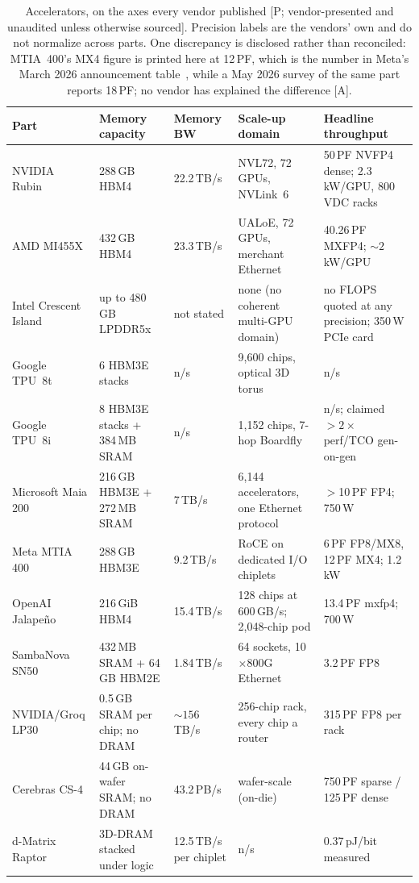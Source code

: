 \begin{table}[htbp]
  \centering
  \scriptsize
  \setlength{\tabcolsep}{3pt}
  \caption{Accelerators, on the axes every vendor published [P; vendor-presented and unaudited unless otherwise sourced]. Precision labels are the vendors' own and do not normalize across parts. One discrepancy is disclosed rather than reconciled: MTIA~400's MX4 figure is printed here at 12\,PF, which is the number in Meta's March 2026 announcement table~\cite{mtia400}, while a May 2026 survey of the same part reports 18\,PF; no vendor has explained the difference [A].}
  \label{tab:hc-accel}
  \begin{tabular}{p{21mm}p{27mm}p{19mm}p{29mm}p{33mm}}
    \toprule
    Part & Memory capacity & Memory BW & Scale-up domain & Headline throughput \\
    \midrule
    NVIDIA Rubin & 288\,GB HBM4 & 22.2\,TB/s & NVL72, 72 GPUs, NVLink~6 & 50\,PF NVFP4 dense; 2.3\,kW/GPU, 800\,VDC racks \\
    \addlinespace
    AMD MI455X & 432\,GB HBM4 & 23.3\,TB/s & UALoE, 72 GPUs, merchant Ethernet & 40.26\,PF MXFP4; ${\sim}2$\,kW/GPU \\
    \addlinespace
    Intel Crescent Island & up to 480\,GB LPDDR5x & not stated & none (no coherent multi-GPU domain) & no FLOPS quoted at any precision; 350\,W PCIe card \\
    \addlinespace
    Google TPU~8t & 6 HBM3E stacks & n/s & 9{,}600 chips, optical 3D torus & n/s~\cite{hc2026-tpu8} \\
    \addlinespace
    Google TPU~8i & 8 HBM3E stacks + 384\,MB SRAM & n/s & 1{,}152 chips, 7-hop Boardfly & n/s; claimed $>2\times$ perf/TCO gen-on-gen~\cite{hc2026-tpu8} \\
    \addlinespace
    Microsoft Maia 200 & 216\,GB HBM3E + 272\,MB SRAM & 7\,TB/s & 6{,}144 accelerators, one Ethernet protocol & $>$10\,PF FP4; 750\,W~\cite{maia200} \\
    \addlinespace
    Meta MTIA 400 & 288\,GB HBM3E & 9.2\,TB/s & RoCE on dedicated I/O chiplets & 6\,PF FP8/MX8, 12\,PF MX4; 1.2\,kW~\cite{mtia400} \\
    \addlinespace
    OpenAI Jalape\~no & 216\,GiB HBM4 & 15.4\,TB/s & 128 chips at 600\,GB/s; 2{,}048-chip pod & 13.4\,PF mxfp4; 700\,W~\cite{hc2026-jalapeno} \\
    \addlinespace
    SambaNova SN50 & 432\,MB SRAM + 64\,GB HBM2E & 1.84\,TB/s & 64 sockets, 10$\times$800G Ethernet & 3.2\,PF FP8 \\
    \addlinespace
    NVIDIA/Groq LP30 & 0.5\,GB SRAM per chip; no DRAM & ${\sim}156$\,TB/s & 256-chip rack, every chip a router & 315\,PF FP8 per rack~\cite{hc2026-lpu} \\
    \addlinespace
    Cerebras CS-4 & 44\,GB on-wafer SRAM; no DRAM & 43.2\,PB/s & wafer-scale (on-die) & 750\,PF sparse / 125\,PF dense \\
    \addlinespace
    d-Matrix Raptor & 3D-DRAM stacked under logic & 12.5\,TB/s per chiplet & n/s & 0.37\,pJ/bit measured \\
    \bottomrule
  \end{tabular}
\end{table}

